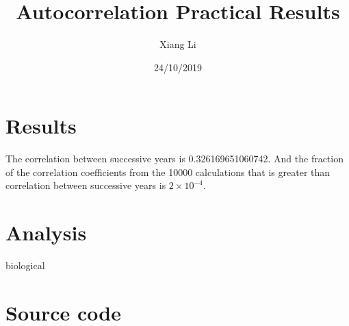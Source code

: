 \documentclass[12pt]{article}
\title{Autocorrelation Practical Results}
\author{Xiang Li}
\date{24/10/2019}
\begin{document}
	\maketitle
	
	
	\section{Results}
	The correlation between successive years is 0.326169651060742.
	And the fraction of the correlation coefficients from the 10000 calculations that is greater than correlation 
    between successive years is $2\times 10^{-4}$.
	
	\section{Analysis}
	biological 

	\section{Source code}
	

\end{document}
